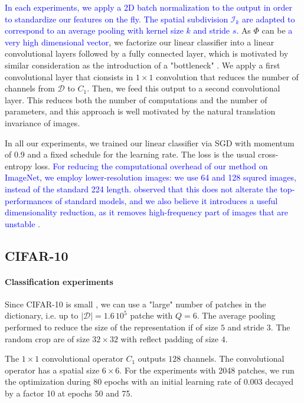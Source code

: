\documentclass{article}
\newcommand{\Edouard}[1]{\textcolor{blue}{#1}}
\begin{document}
{\Edouard{In each experiments, we apply a 2D batch normalization to the output \Edouard{in order to standardize our features on the fly}. The spatial subdivision $\mathcal{I}_k$ are adapted to correspond to an average pooling with kernel size $k$ and stride $s$. }As  $\Phi$ can be \Edouard{a very high dimensional vector}, we factorize our linear classifier into a linear convolutional layers followed by a fully connected layer}, which is motivated by similar consideration as the introduction of a "bottleneck" \cite{ResNet}. We apply a first convolutional layer that cionsists in $1\times 1$ convolution that reduces the number of channels from $\mathcal{D}$ to $C_1$. Then, we feed this output to a second convolutional layer.
This reduces both the number of computations and the number of parameters, and this approach is well motivated by the natural translation invariance of images.

In all our experiments, we trained our linear classifier via SGD with momentum of 0.9 and a fixed schedule for the learning rate.
The loss is the usual cross-entropy loss. \Edouard{ For reducing the computational overhead of our method on ImageNet, we employ lower-resolution images: we use 64 and 128 squred images, instead of the standard 224 length.  \cite{DBLP:journals/corr/ChrabaszczLH17} observed that this does not alterate the top-performances of standard models, and we also believe it introduces a useful dimensionality reduction, as it removes high-frequency part of images that are unstable \citet{chjdq}.} 


\subsection{CIFAR-10}

\paragraph{Classification experiments} Since CIFAR-10 is small , we can use a "large" number of patches in the dictionary, i.e. up to $|\mathcal{D}|=1.6\,10^5$ patche with $Q = 6$.
The average pooling performed to reduce the size of the representation if of size $5$ and stride $3$.
The random crop are of size $32\times 32$ with reflect padding of size $4$.

The $1 \times 1$ convolutional operator $C_1$ outputs $128$ channels.
The convolutional operator has a spatial size $6 \times 6$.
For the experiments with 2048 patches, we run the optimization during 80 epochs with an initial learning rate of $0.003$ decayed by a factor 10 at epochs 50 and 75.
\end{document}
